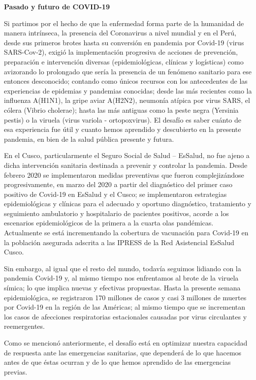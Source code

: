 \documentclass[12pt,a4paper,openany]{book}
\begin{document}
	\noindent \textbf{Pasado y futuro de COVID-19}
		

Si partimos por el hecho de que la enfermedad forma parte de la humanidad de manera intrínseca, la presencia del Coronavirus a nivel mundial y en el Perú, desde sus primeros brotes hasta su conversión en pandemia por Covid-19 (virus SARS-Cov-2), exigió la implementación progresiva de acciones de prevención, preparación e intervención diversas (epidemiológicas, clínicas y logísticas) como avizorando lo prolongado que sería la presencia de un fenómeno sanitario para ese entonces desconocido; contando como únicos recursos con los antecedentes de las experiencias de epidemias y pandemias conocidas; desde las más recientes como la influenza A(H1N1), la gripe aviar A(H2N2), neumonía atípica por virus SARS, el cólera (Vibrio cholerae); hasta las más antiguas como la peste negra (Yersinia pestis) o la viruela (virus variola - ortopoxvirus). El desafío es saber cuánto de esa experiencia fue útil y cuanto hemos aprendido y descubierto en la presente pandemia, en bien de la salud pública presente y futura.

En el Cusco, particularmente el Seguro Social de Salud – EsSalud, no fue ajeno a dicha intervención sanitaria destinada a prevenir y controlar la pandemia. Desde febrero 2020 se implementaron medidas preventivas que fueron complejizándose progresivamente, en marzo del 2020 a partir del diagnóstico del primer caso positivo de Covid-19 en EsSalud y el Cusco; se implementaron estrategias epidemiológicas y clínicas para el adecuado y oportuno diagnóstico, tratamiento y seguimiento ambulatorio y hospitalario de pacientes positivos, acorde a los escenarios epidemiológicos de la primera a la cuarta olas pandémicas. Actualmente se está incrementando la cobertura de vacunación para Covid-19 en la población asegurada adscrita a las IPRESS de la Red Asistencial EsSalud Cusco.

Sin embargo, al igual que el resto del mundo, todavía seguimos lidiando con la pandemia Covid-19 y, al mismo tiempo nos enfrentamos al brote de la viruela símica; lo que implica nuevas y efectivas propuestas. Hasta la presente semana epidemiológica, se registraron 170 millones de casos y casi 3 millones de muertes por Covid-19 en la región de las Américas; al mismo tiempo que se incrementan los casos de afecciones respiratorias estacionales causadas por virus circulantes y reemergentes.

Como se mencionó anteriormente, el desafío está en optimizar nuestra capacidad de respuesta ante las emergencias sanitarias, que dependerá de lo que hacemos antes de que éstas ocurran y de lo que hemos aprendido de las emergencias previas.
\end{document}
